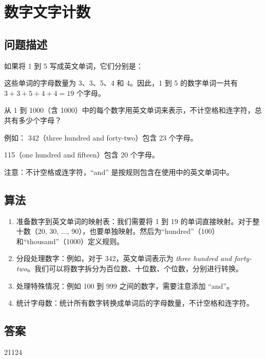 \section{数字文字计数}\label{sec:problem17}
\subsection{问题描述}
\begin{tcolorbox}
	如果将 1 到 5 写成英文单词，它们分别是：

	\begin{itemize}
	\end{itemize}
	这些单词的字母数量为 3、3、5、4 和 4。因此，1 到 5 的数字单词一共有
	$ 3 + 3 + 5 + 4 + 4 = 19 $
	个字母。

	从 1 到 1000（含 1000）中的每个数字用英文单词来表示，不计空格和连字符，总共有多少个字母？

	例如：
	342（three hundred and forty-two）包含 23 个字母。

	115（one hundred and fifteen）包含 20 个字母。

	注意：不计空格或连字符，\enquote{and} 是按规则包含在使用中的英文单词中。
\end{tcolorbox}

\subsection{算法}
\begin{enumerate}
	\item 准备数字到英文单词的映射表：我们需要将 1 到 19 的单词直接映射。对于整十数（20, 30, ...,
		90），也要单独映射。然后为\enquote{hundred}（100）和\enquote{thousand}（1000）定义规则。
	\item 分段处理数字：例如，对于 342，英文单词表示为 \textit{three hundred and forty-two}。我们可以将数字拆分为百位数、十位数、个位数，分别进行转换。
	\item 处理特殊情况：例如 100 到 999 之间的数字，需要注意添加 \enquote{and}。
	\item 统计字母数：统计所有数字转换成单词后的字母数量，不计空格和连字符。
\end{enumerate}

\subsection{答案}
21124
